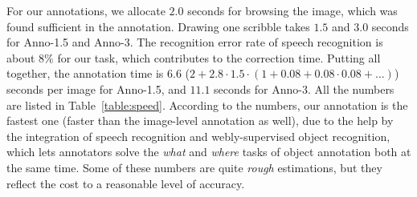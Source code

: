 For our annotations, we allocate $2.0$ seconds for browsing the image, which was found sufficient in the annotation. Drawing one scribble takes $1.5$ and $3.0$ seconds for Anno-1.5 and
Anno-3. The recognition error rate of speech recognition is about
$8\%$ for our task, which contributes to the correction time. Putting
all together, the annotation time is $6.6$ ($2+2.8\cdot 1.5\cdot (1+0.08+0.08\cdot 0.08 + 
...)$) seconds per image for Anno-1.5, and $11.1$ seconds for
Anno-3.  All the
numbers are listed in Table~\ref{table:speed}. According to the
numbers, our annotation is the fastest one (faster than the
image-level annotation as well), due to the help by the integration of speech
recognition and webly-supervised object recognition, which lets annotators solve the \emph{what} and \emph{where} tasks of object annotation both at the same time. Some of these numbers are quite \emph{rough} estimations, but
they reflect the cost to a reasonable level of accuracy.




